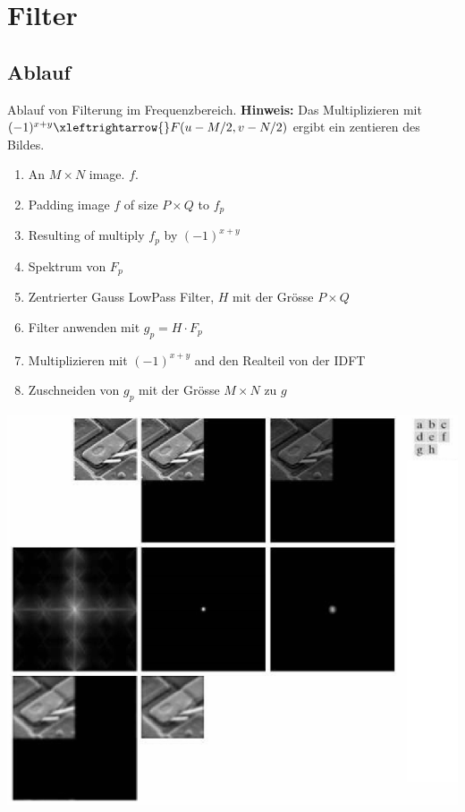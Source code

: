 \section{Filter}
\subsection{Ablauf}
Ablauf von Filterung im Frequenzbereich. \textbf{Hinweis:} Das Multiplizieren mit $(-1)^{x+y} \xleftrightarrow{} F(u-M/2, v - N/2)$ ergibt ein zentieren des Bildes.
\begin{enumerate}[label=\alph*., nosep]
	\item An $M\times N$ image. $f$.
	\item Padding image $f$ of size $P \times Q$ to $f_p$
	\item Resulting of multiply $f_p$ by $(-1)^{x+y}$
	\item Spektrum von $F_p$
	\item Zentrierter Gauss LowPass Filter, $H$ mit der Grösse $P \times Q$
	\item Filter anwenden mit $g_p = H \cdot F_p$
	\item Multiplizieren mit $(-1)^{x+y}$ and den Realteil von der IDFT
	\item Zuschneiden von $g_p$ mit der Grösse $M\times N$ zu $g$
\end{enumerate}
\begin{center}
	\includegraphics[width=\columnwidth]{Images/filtering}
\end{center}

